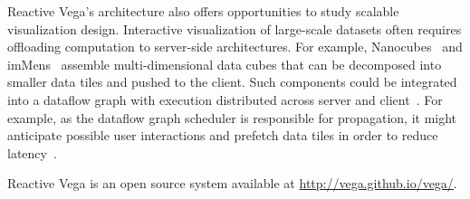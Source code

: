Reactive Vega's architecture also offers opportunities to study scalable
visualization design. Interactive visualization of large-scale datasets often
requires offloading computation to server-side architectures. For example,
Nanocubes~\cite{lins:nanocubes} and imMens~\cite{liu:immens} assemble
multi\--dimensional data cubes that can be decomposed into smaller data tiles
and pushed to the client. Such components could be integrated into a dataflow
graph with execution distributed across server and client~\cite{domoritz:dsia}.
For example, as the dataflow graph scheduler is responsible for propagation, it
might anticipate possible user interactions and prefetch data tiles in order to
reduce latency~\cite{battle:prefetch}.

Reactive Vega is an open source system available at
\url{http://vega.github.io/vega/}.